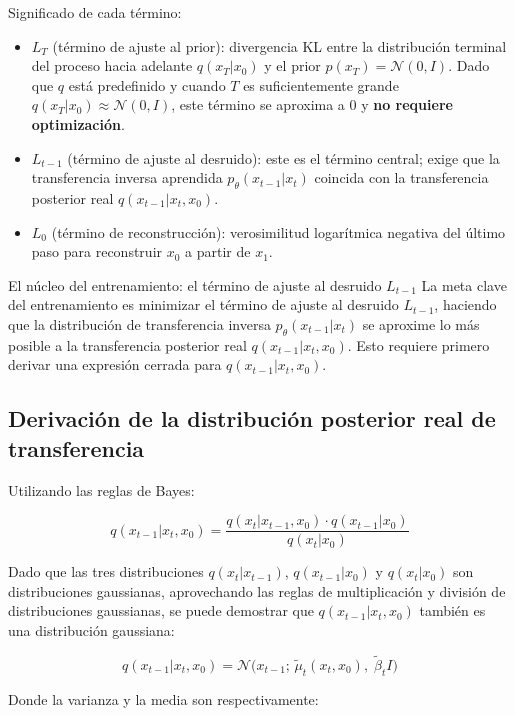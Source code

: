 Significado de cada término:
\begin{itemize}
    \item $L_T$ (término de ajuste al prior): divergencia KL entre la distribución terminal del proceso hacia adelante $q(x_T|x_0)$ y el prior $p(x_T) = \mathcal{N}(0,I)$. Dado que $q$ está predefinido y cuando $T$ es suficientemente grande $q(x_T|x_0) \approx \mathcal{N}(0,I)$, este término se aproxima a 0 y \textbf{no requiere optimización}.
    \item $L_{t-1}$ (término de ajuste al desruido): este es el término central; exige que la transferencia inversa aprendida $p_\theta(x_{t-1}|x_t)$ coincida con la transferencia posterior real $q(x_{t-1}|x_t, x_0)$.
    \item $L_0$ (término de reconstrucción): verosimilitud logarítmica negativa del último paso para reconstruir $x_0$ a partir de $x_1$.
\end{itemize}

\begin{importantbox}{El núcleo del entrenamiento: el término de ajuste al desruido $L_{t-1}$}
La meta clave del entrenamiento es minimizar el término de ajuste al desruido $L_{t-1}$, haciendo que la distribución de transferencia inversa $p_\theta(x_{t-1}|x_t)$ se aproxime lo más posible a la transferencia posterior real $q(x_{t-1}|x_t, x_0)$. Esto requiere primero derivar una expresión cerrada para $q(x_{t-1}|x_t, x_0)$.
\end{importantbox}

\subsection{Derivación de la distribución posterior real de transferencia}

Utilizando las reglas de Bayes:

$$q(x_{t-1}|x_t, x_0) = \frac{q(x_t|x_{t-1}, x_0) \cdot q(x_{t-1}|x_0)}{q(x_t|x_0)}$$

Dado que las tres distribuciones $q(x_t|x_{t-1})$, $q(x_{t-1}|x_0)$ y $q(x_t|x_0)$ son distribuciones gaussianas, aprovechando las reglas de multiplicación y división de distribuciones gaussianas, se puede demostrar que $q(x_{t-1}|x_t, x_0)$ también es una distribución gaussiana:

$$q(x_{t-1}|x_t, x_0) = \mathcal{N}\big(x_{t-1};\, \tilde{\mu}_t(x_t, x_0),\; \tilde{\beta}_t I\big)$$

Donde la varianza y la media son respectivamente:

